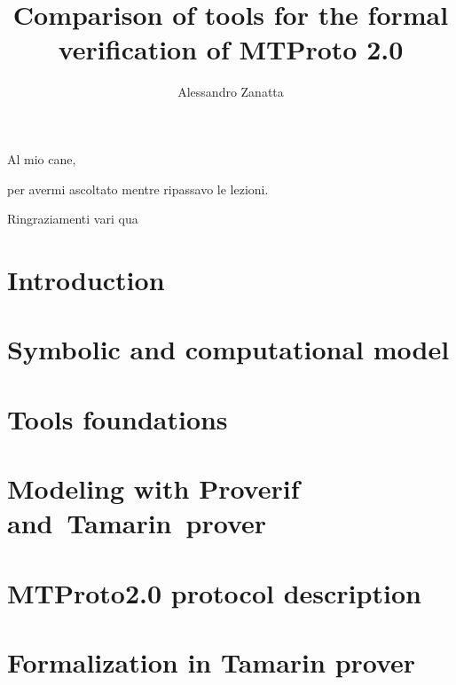 \documentclass[target=bach,aauheader=]{thud}
\title{Comparison of tools for the formal verification of MTProto 2.0}
\author{Alessandro Zanatta}
\begin{document}
\maketitle

\begin{dedication}
  Al mio cane,\par per avermi ascoltato mentre ripassavo le lezioni.
\end{dedication}

\acknowledgements
Ringraziamenti vari qua


\tableofcontents



\mainmatter

\chapter{Introduction}


\chapter{Symbolic and computational model}


\chapter{Tools foundations}


\chapter{Modeling with Proverif and~Tamarin~prover}


\chapter{MTProto2.0 protocol description}


\chapter{Formalization in Tamarin prover}

\end{document}
